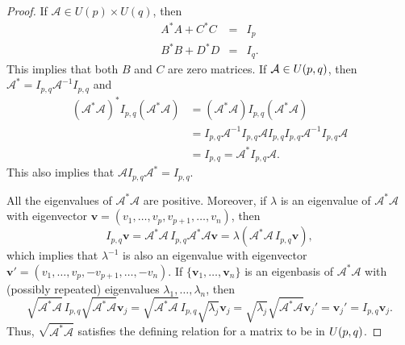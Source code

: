 \begin{proof}
    If $\mathcal{A}\in U(p)\times U(q)$, then 
    \begin{eqnarray*}
        A^\ast A+C^\ast C& = & I_p\\
        B^\ast B+D^\ast D& = & I_q.
    \end{eqnarray*}
    This implies that both $B$ and $C$ are zero matrices. If $\mathcal{A}\in U(p,q)$, then $\mathcal{A}^\ast=I_{p,q}\mathcal{A}^{-1}I_{p,q}$ and
    \begin{align*}
        (\mathcal{A}^\ast\mathcal{A})^\ast I_{p,q}(\mathcal{A}^\ast\mathcal{A}) & =(\mathcal{A}^\ast\mathcal{A}) I_{p,q}(\mathcal{A}^\ast\mathcal{A}) \\
        & =I_{p,q}\mathcal{A}^{-1}I_{p,q}\mathcal{A}I_{p,q} I_{p,q}\mathcal{A}^{-1}I_{p,q}\mathcal{A}\\
        & =I_{p,q}=\mathcal{A}^\ast I_{p,q}\mathcal{A}.
    \end{align*}
    This also implies that $\mathcal{A}  I_{p,q}\mathcal{A}^\ast=I_{p,q}$. 

    \vspace{0.1cm}
    \hf All the eigenvalues of $\mathcal{A}^\ast\mathcal{A}$ are positive. Moreover, if $\lambda$ is an eigenvalue of $\mathcal{A}^\ast\mathcal{A}$ with eigenvector $\mathbf{v}=(v_1,\ldots,v_p,v_{p+1},\ldots, v_n)$, then 
    \begin{displaymath}
        I_{p,q}\mathbf{v}=\mathcal{A}^\ast\mathcal{A}\,I_{p,q}\mathcal{A}^\ast\mathcal{A}\mathbf{v}=\lambda(\mathcal{A}^\ast\mathcal{A}\,I_{p,q}\mathbf{v}),
    \end{displaymath}
    which implies that $\lambda^{-1}$ is also an eigenvalue with eigenvector $\mathbf{v}'=(v_1,\ldots,v_p,-v_{p+1},\ldots, -v_n)$. If $\{\mathbf{v}_1, \ldots,\mathbf{v}_n\}$ is an eigenbasis of $\mathcal{A}^\ast\mathcal{A}$ with (possibly repeated) eigenvalues $\lambda_1,\ldots,\lambda_n$, then 
    \begin{displaymath}
        \sqrt{\mathcal{A}^\ast\mathcal{A}}\,I_{p,q}\sqrt{\mathcal{A}^\ast\mathcal{A}}\mathbf{v}_j=\sqrt{\mathcal{A}^\ast\mathcal{A}}\,I_{p,q}\sqrt{\lambda_j}\mathbf{v}_j=\sqrt{\lambda_j}\sqrt{\mathcal{A}^\ast\mathcal{A}}\mathbf{v}_j'=\mathbf{v}_j'=I_{p,q}\mathbf{v}_j.
    \end{displaymath}
    Thus, $\sqrt{\mathcal{A}^\ast\mathcal{A}}$ satisfies the defining relation for a matrix to be in $U(p,q)$. 
\end{proof}


